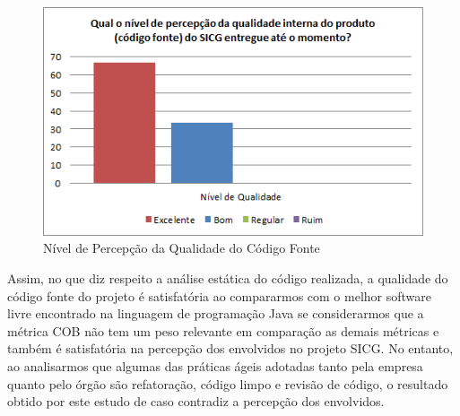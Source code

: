 \begin{figure}[H]
		\centering
			\includegraphics[scale=1.0]{figuras/percepcaoqualidade.png}
		\caption{Nível de Percepção da Qualidade do Código Fonte}
		\label{percepcaoqualidade}
\end{figure}

Assim, no que diz respeito a análise estática do código realizada, a qualidade do código fonte do projeto é satisfatória ao compararmos com o melhor software livre encontrado na linguagem de programação Java se considerarmos que a métrica COB não tem um peso relevante em comparação as demais métricas e também é satisfatória na percepção dos envolvidos no projeto SICG. No entanto, ao analisarmos que algumas das práticas ágeis adotadas tanto pela empresa quanto pelo órgão são refatoração, código limpo e revisão de código, o resultado obtido por este estudo de caso contradiz a percepção dos envolvidos.



